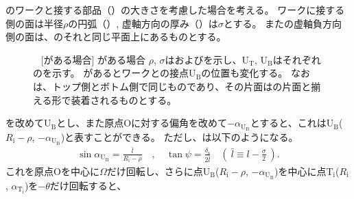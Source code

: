 \clearpage
\Jig のワークと接する部品（\textbf{\ReceiverPlate}）の大きさを考慮した場合を考える。
ワークに接する側の面は半径$\rho$の円弧（\ReceiverPlateRadius）, 虚軸方向の厚み（\ReceiverPlateWidth）は$\sigma$とする。
また\ReceiverPlate の虚軸負方向側の面は、\Jig のそれと同じ平面上にあるものとする。
\begin{figure}[p]%
\begin{Figbox}[valign=top]%
%
\vfill~
[\ReceiverPlate がある場合]{%
 \ReceiverPlate がある場合\newline
 $\rho$, $\sigma$は\ReceiverPlateRadius および\ReceiverPlateWidth を示し、U$_\mathrm T$, U$_\mathrm B$はそれぞれの\ReceiverPlateCenter を示す。
 \ReceiverPlate があるとワークとの接点U$_\mathrm B$の位置も変化する。
 なお\ReceiverPlate は、トップ側とボトム側で同じものであり、その片面は\Jig の片面と揃える形で装着されるものとする。
 }%
\end{Figbox}%
\end{figure}%
\ReceiverPlateCenter を改めてU$_\mathrm B$とし、また原点Oに対する偏角を改めて$-\alpha_{\mathrm U_\mathrm B}$とすると、これはU$_\mathrm B$($R_\mathrm i-\rho$, $-\alpha_{\mathrm U_\mathrm B}$)と表すことができる。
ただし、は以下のようになる。
\begin{align*}
  \sin\alpha_{\mathrm U_\mathrm B} = \frac{\bar l}{R_\mathrm i-\rho}\quad, \quad
  \tan\psi = \frac{\delta_\mathrm s}{2\bar l} \quad
  \left(~\bar l \equiv l-\frac\sigma2~\right).
\end{align*}
これを原点Oを中心に$\Omega$だけ回転し、さらに点U$_\mathrm B$($R_\mathrm i-\rho$, $-\alpha_{\mathrm U_\mathrm B}$)を中心に点T$_\mathrm i$($R_\mathrm i$, $\alpha_{\mathrm T_\mathrm i}$)を$-\theta$だけ回転すると、
